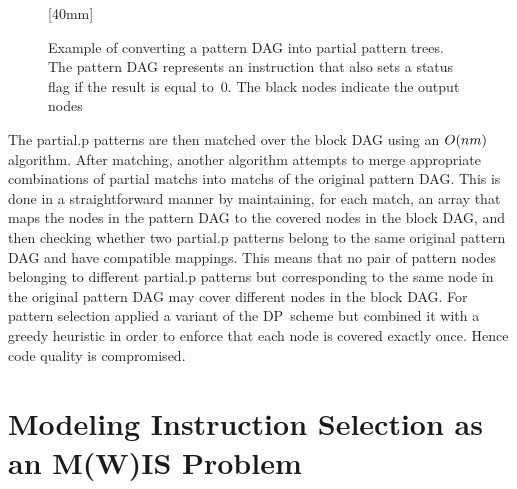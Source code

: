 \begin{figure}
  \mbox{}%
  \hfill%
                [40mm]%
                {%
                }%
  \hfill%
                {%
                  \hspace{1.5em}%
                }%
  \hfill%
  \mbox{}

  \caption[Example of converting a pattern DAG into partial tree patterns]%
          {%
            Example of converting a pattern DAG into partial pattern trees.
            The pattern DAG represents an  instruction that also
            sets a status flag if the result is equal to~\num{0}.
            The black nodes indicate the output nodes%
          }
\end{figure}

The \gls{partial.p} \glspl{pattern} are then matched over the \gls{block DAG}
using an \mbox{$O(nm)$} algorithm.
%
After matching, another algorithm attempts to merge appropriate combinations of
partial \glspl{match} into \glspl{match} of the original \gls{pattern DAG}.
%
This is done in a straightforward manner by maintaining, for each \gls{match},
an array that maps the \glspl{node} in the \gls{pattern DAG} to the covered
\glspl{node} in the \gls{block DAG}, and then checking whether two
\gls{partial.p} \glspl{pattern} belong to the same original \gls{pattern DAG}
and have compatible mappings.
%
This means that no pair of \gls{pattern} \glspl{node} belonging to different
\gls{partial.p} \glspl{pattern} but corresponding to the same \gls{node} in the
original \gls{pattern DAG} may cover different \glspl{node} in the \gls{block
  DAG}.
%
For \gls{pattern selection} \citeauthor{ArnoldCorporaal:1999} applied a variant of the
\gls{DP}~scheme but combined it with a greedy heuristic in order to enforce that
each \gls{node} is covered exactly once.
%
Hence code quality is compromised.


\section{Modeling Instruction Selection as an M(W)IS Problem}

